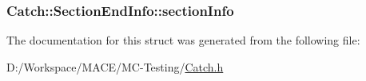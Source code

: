 \subsubsection[{\texorpdfstring{section\+Info}{sectionInfo}}]{ Catch\+::\+Section\+End\+Info\+::section\+Info}\hypertarget{struct_catch_1_1_section_end_info_a2d44793392cb83735d086d726822abe9}{}\label{struct_catch_1_1_section_end_info_a2d44793392cb83735d086d726822abe9}


The documentation for this struct was generated from the following file\+:\begin{DoxyCompactItemize}
\item 
D\+:/\+Workspace/\+M\+A\+C\+E/\+M\+C-\/\+Testing/\hyperlink{_catch_8h}{Catch.\+h}\end{DoxyCompactItemize}
